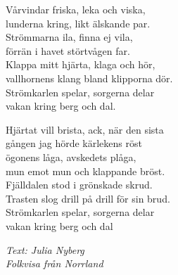 \vspace{10pt}
Vårvindar friska, leka och viska,\\
lunderna kring, likt älskande par.\\
Strömmarna ila, finna ej vila,\\
förrän i havet störtvågen far.\\
Klappa mitt hjärta, klaga och hör,\\
vallhornens klang bland klipporna dör.\\
Strömkarlen spelar, sorgerna delar\\
vakan kring berg och dal.\par
\vspace{10pt}
Hjärtat vill brista, ack, när den sista \\
gången jag hörde kärlekens röst\\
ögonens låga, avskedets plåga,\\
mun emot mun och klappande bröst.\\
Fjälldalen stod i grönskade skrud.\\
Trasten slog drill på drill för sin brud.\\
Strömkarlen spelar, sorgerna delar\\
vakan kring berg och dal\par
\vspace{10pt}
{\footnotesize\textit{Text: Julia Nyberg\\ Folkvisa från Norrland}}
